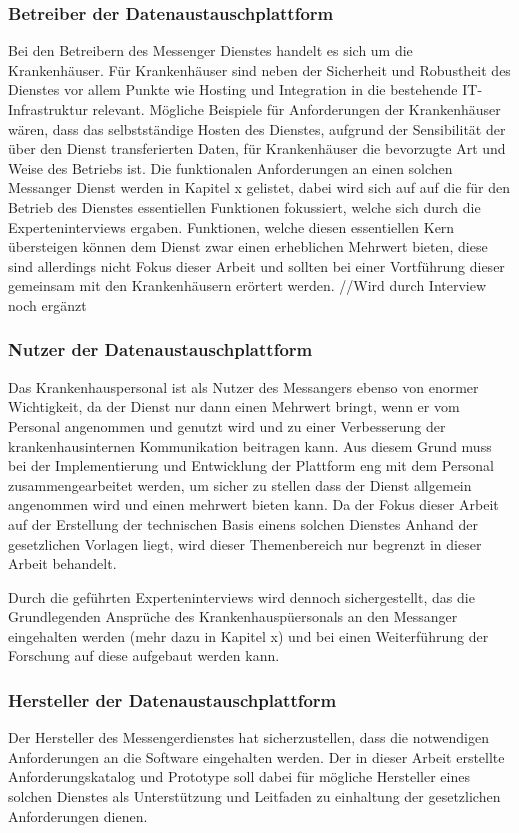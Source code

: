 \subsubsection{Betreiber der Datenaustauschplattform}\label{subsection:bdd}
Bei den Betreibern des Messenger Dienstes handelt es sich um die Krankenhäuser. Für Krankenhäuser sind neben der Sicherheit und Robustheit des Dienstes vor allem Punkte wie Hosting und Integration in die bestehende IT-Infrastruktur relevant.
Mögliche Beispiele für Anforderungen der Krankenhäuser wären, dass das selbstständige Hosten des Dienstes, aufgrund der Sensibilität der über den Dienst transferierten Daten, für Krankenhäuser die bevorzugte Art und Weise des Betriebs ist. Die funktionalen Anforderungen an einen solchen Messanger Dienst werden in Kapitel x gelistet, dabei wird sich auf auf die für den Betrieb des Dienstes essentiellen Funktionen fokussiert, welche sich durch die Experteninterviews ergaben. Funktionen, welche diesen essentiellen Kern übersteigen können dem Dienst zwar einen erheblichen Mehrwert bieten, diese sind allerdings nicht Fokus dieser Arbeit und sollten bei einer Vortführung dieser gemeinsam mit den Krankenhäusern erörtert werden.
//Wird durch Interview noch ergänzt

\subsubsection{Nutzer der Datenaustauschplattform}\label{subsection:ndd}
Das Krankenhauspersonal ist als Nutzer des Messangers ebenso von enormer Wichtigkeit, da der Dienst nur dann einen Mehrwert bringt, wenn er vom Personal angenommen und genutzt wird und zu einer Verbesserung der krankenhausinternen Kommunikation beitragen kann. Aus diesem Grund muss bei der Implementierung und Entwicklung der Plattform eng mit dem Personal zusammengearbeitet werden, um sicher zu stellen dass der Dienst allgemein angenommen wird und einen mehrwert bieten kann. Da der Fokus dieser Arbeit auf der Erstellung der technischen Basis einens solchen Dienstes Anhand der gesetzlichen Vorlagen liegt, wird dieser Themenbereich nur begrenzt in dieser Arbeit behandelt. 

Durch die geführten Experteninterviews wird dennoch sichergestellt, das die Grundlegenden Ansprüche des Krankenhauspüersonals an den Messanger eingehalten werden (mehr dazu in Kapitel x) und bei einen Weiterführung der Forschung auf diese aufgebaut werden kann.

\subsubsection{Hersteller der Datenaustauschplattform}\label{subsection:hdd}
Der Hersteller des Messengerdienstes hat sicherzustellen, dass die notwendigen Anforderungen an die Software eingehalten werden.
Der in dieser Arbeit erstellte Anforderungskatalog und Prototype soll dabei für mögliche Hersteller eines solchen Dienstes als Unterstützung und Leitfaden zu einhaltung der gesetzlichen Anforderungen dienen.

